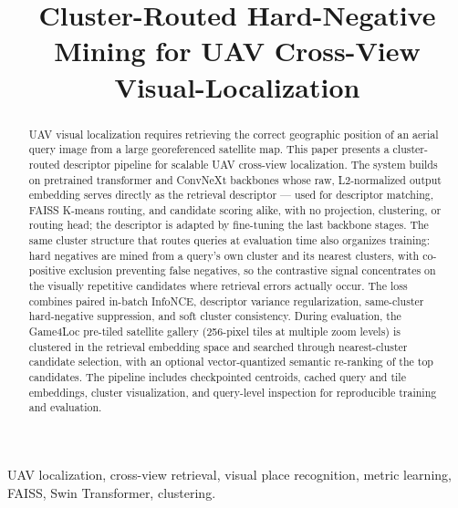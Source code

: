 \documentclass[conference]{IEEEtran}
\begin{document}
\title{Cluster-Routed Hard-Negative Mining for UAV Cross-View Visual-Localization}

\author{
\and
{}
}

\maketitle

\begin{abstract}
UAV visual localization requires retrieving the correct geographic position
of an aerial query image from a large georeferenced satellite map. This paper
presents a cluster-routed descriptor pipeline for scalable UAV
cross-view localization. The system builds on pretrained transformer and ConvNeXt
backbones whose raw, L2-normalized output embedding serves directly as the
retrieval descriptor — used for descriptor matching, FAISS K-means routing,
and candidate scoring alike, with no projection, clustering, or routing head;
the descriptor is adapted by fine-tuning the last backbone stages. The same
cluster structure that routes queries at evaluation time also organizes
training: hard negatives are mined from a query's own cluster and its nearest
clusters, with co-positive exclusion preventing false negatives, so the
contrastive signal concentrates on the visually repetitive candidates where
retrieval errors actually occur. The loss combines paired in-batch InfoNCE,
descriptor variance regularization, same-cluster hard-negative suppression,
and soft cluster consistency. During
evaluation, the Game4Loc pre-tiled satellite gallery (256-pixel tiles at
multiple zoom levels) is clustered in the retrieval embedding space
and searched through nearest-cluster candidate selection, with an optional
vector-quantized semantic re-ranking of the top candidates. The pipeline
includes checkpointed
centroids, cached query and tile embeddings, cluster visualization, and
query-level inspection for reproducible training and evaluation.
\end{abstract}

\begin{IEEEkeywords}
UAV localization, cross-view retrieval, visual place recognition, metric
learning, FAISS, Swin Transformer, clustering.
\end{IEEEkeywords}
\end{document}
